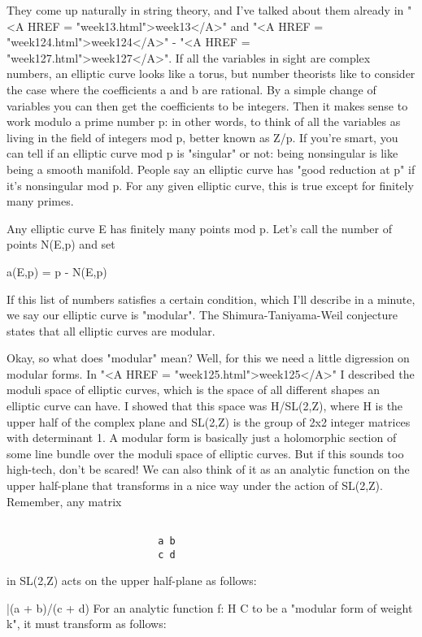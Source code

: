 They come up naturally in string theory, and I've talked about them
already in "<A HREF = "week13.html">week13</A>" and "<A
HREF = "week124.html">week124</A>" - "<A HREF =
"week127.html">week127</A>".  If all the variables in sight are
complex numbers, an elliptic curve looks like a torus, but number
theorists like to consider the case where the coefficients a and b are
rational.  By a simple change of variables you can then get the
coefficients to be integers.  Then it makes sense to work modulo a
prime number p: in other words, to think of all the variables as
living in the field of integers mod p, better known as Z/p.  If you're
smart, you can tell if an elliptic curve mod p is "singular"
or not: being nonsingular is like being a smooth manifold.  People say
an elliptic curve has "good reduction at p" if it's
nonsingular mod p.  For any given elliptic curve, this is true except
for finitely many primes.

Any elliptic curve E has finitely many points mod p.  Let's call the 
number of points N(E,p) and set

a(E,p) = p - N(E,p)

If this list of numbers satisfies a certain condition, which I'll
describe in a minute, we say our elliptic curve is "modular".  The
Shimura-Taniyama-Weil conjecture states that all elliptic curves
are modular.

Okay, so what does "modular" mean?  Well, for this we need a
little digression on modular forms.  In "<A HREF =
"week125.html">week125</A>" I described the moduli space of
elliptic curves, which is the space of all different shapes an
elliptic curve can have.  I showed that this space was H/SL(2,Z),
where H is the upper half of the complex plane and SL(2,Z) is the
group of 2x2 integer matrices with determinant 1.  A modular form is
basically just a holomorphic section of some line bundle over the
moduli space of elliptic curves.  But if this sounds too high-tech,
don't be scared!  We can also think of it as an analytic function on
the upper half-plane that transforms in a nice way under the action of
SL(2,Z).  Remember, any matrix


\begin{verbatim}

                          a b
                          c d

\end{verbatim}
    
in SL(2,Z) acts on the upper half-plane as follows:

                \tau  |\to  (a \tau  + b)/(c \tau  + d)
For an analytic function f: H \to  C to be a "modular form of
weight k", it must transform as follows:

